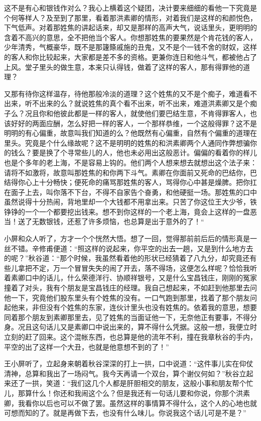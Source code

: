 \documentclass[12pt,UTF8]{ctexbook}
\begin{document}
{{{这不是有心和银钱作对么？我心上横着这个疑团，决计要来细细的看他一下究竟是个何等样人？及至到了那里，看着那洪素卿的情形，对着我们是这样的和颜悦色，下气低声。对着那姓焦的讲起话来，却又是那样的高声大气，说话里头，更明明的含着不高兴的意思，全不把他当个客人。你想那姓焦的要果然是个肯花钱的客人，少年清秀，气概豪华，既不是那籧篨戚施的丑鬼，又不是个一钱不舍的财奴，这样的客人和你比较起来，大家都是差不多的资格。更兼你连日和他斗气，都被他占了上风。堂子里头的做生意，本来只认得钱，做着了这样的客人，那有得罪他的道理？

又那有待你这样温存，待他那般冷淡的道理？这个姓焦的又不是个痴子，难道看不出来，听不出来的么？就说姓焦的真个看不出来，听不出来，难道洪素卿又是个痴子么？况且你和他彼此都是一样的客人，就使他们要巴结生意，不肯得罪客人，也该好好的两面应酬，怎么好把一样的客人，一个那样恭维，一个这般得罪？这不是明明的有心偏重，故意叫我们知道的么？他既然有心偏重，自然有个偏重的道理在里头。究竟是个什么缘故呢？这不是明明的姓焦的和洪素卿两个人通同作弊想骗你的钱么？要是换了个寻常些儿的人，他也未必用出这般恶计。偏偏的看着你的样儿也是个多年的老上海，不是容易上钩的。他们两个人想来想去就想出这个法子来：请将不如激将，故意叫那姓焦的和你两下斗气。素卿在你面前又死命的巴结你，巴结得你心上十分畅快；便死命的痛骂那姓焦的客人，骂得你心中甚是燥脾。把你扛在面子上去，叫你落不下台，不得不自家告个奋勇，和他硬挺一场。那姓焦的口中虽然说得十分热闹，背地里却一个大钱都不用拿出来。只苦了你这位王大少爷，铁铮铮的一个一个都要挖出钱来。想不到你这样的一个老上海，竟会上这样的一盘恶当！送了无数银钱，还惹了许多烦恼，也总算是出于意外的了！“

小屏和众人听了，方才一个个恍然大悟。想了一回，觉得那前前后后的情形真是一丝不错。辛修甫便道：“照这样的说起来，你平空的出去一趟，又是到什么地方去的呢？”秋谷道：“那个时候，我虽然看着他的形状已经猜着了八九分，却究竟还有些儿拿把不定，万一个冒冒失失的闹了开去，落不得场，这便怎么样呢？恰恰我听着素卿口中的话儿，什么荣德洋行、协顺祥银号，又是什么宝昌钱庄，刚刚的冤家撞着了对头，我有个朋友是宝昌钱庄的经理。我自己想起来，不如赶到他那里去问他一下，究竟他们股东里头有个姓焦的没有。一口气跑到那里，找着了那个朋友问起他来，非但没有个姓焦的东家，连伙计里头也没有姓焦的。依着我的意思，想要同着那个朋友到素卿那里去，见了姓焦的当面证他一下，无奈他正有要事，不得分身。况且这句话儿又是素卿口中说出来的，算不得什么凭据。这般一想，我便立时立刻的赶了回来。这个混帐东西，也总算是他的流年不利，撞在我章秋谷的手内，平空的出了这样一个大丑，也就是他意想不到的了！”

王小屏听了，立起身来朝着秋谷深深的打上一拱，口中说道：“这件事儿实在仰仗清神，总算和我出了一场闷气。我今天再请一个双台，算个谢仪何如？”秋谷立起来还了一拱，笑道：“我们这几个人都是肝胆相交的朋友，这般小事和朋友帮个忙儿，那算什么！你还和我闹这个么？但是我还有一句话儿要和你说，你那个洪素卿，我看你以后也可以不做了罢。虽然这样的事情算不得什么，这个人的心地也就可想而知的了。就是再做下去，也没有什么味儿。你说我这个话儿可是不是？”

}}}
\end{document}
